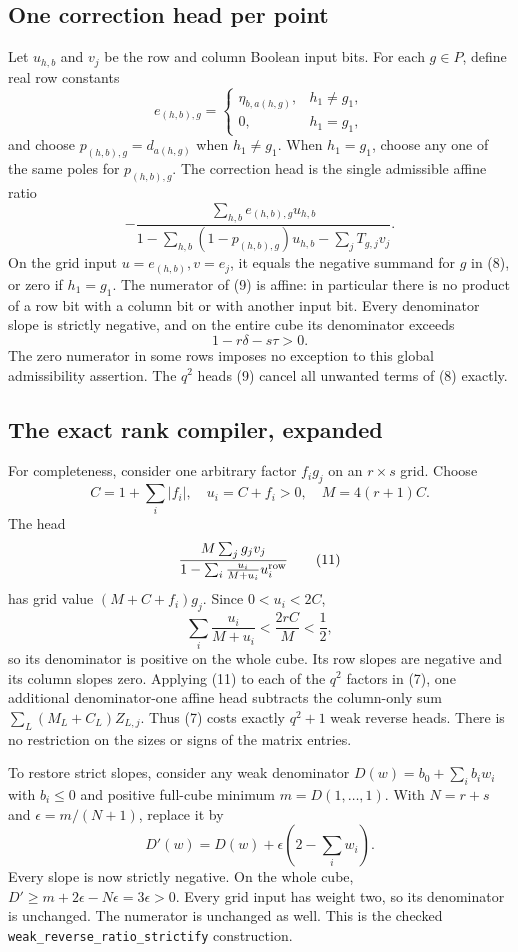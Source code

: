 \documentclass[11pt]{article}
\begin{document}
\subsection{One correction head per point}
Let $u_{h,b}$ and $v_j$ be the row and column Boolean input bits.
For each $g\in P$, define real row constants
\[
 e_{(h,b),g}=
 \begin{cases}\eta_{b,a(h,g)},&h_1\ne g_1,\\0,&h_1=g_1,\end{cases}
\]
and choose $p_{(h,b),g}=d_{a(h,g)}$ when $h_1\ne g_1$.
When $h_1=g_1$, choose any one of the same poles for $p_{(h,b),g}$.
The correction head is the single admissible affine ratio
\[
 -\frac{\sum_{h,b}e_{(h,b),g}u_{h,b}}
 {1-\sum_{h,b}(1-p_{(h,b),g})u_{h,b}-\sum_jT_{g,j}v_j}.
 \tag{9}
\]
On the grid input $u=e_{(h,b)},v=e_j$, it equals the negative
summand for $g$ in (8), or zero if $h_1=g_1$. The numerator of (9)
is affine: in particular there is no product of a row bit with a
column bit or with another input bit. Every denominator slope is
strictly negative, and on the entire cube its denominator exceeds
\[
 1-r\delta-s\tau>0.
 \tag{10}
\]
The zero numerator in some rows imposes no exception to this global
admissibility assertion. The $q^2$ heads (9) cancel all unwanted
terms of (8) exactly.

\subsection{The exact rank compiler, expanded}
For completeness, consider one arbitrary factor $f_i g_j$ on an
$r\times s$ grid. Choose
\[
 C=1+\sum_i|f_i|,\quad u_i=C+f_i>0,
 \quad M=4(r+1)C.
\]
The head
\[
 \frac{M\sum_jg_jv_j}
 {1-\sum_i\frac{u_i}{M+u_i}u^{\rm row}_i}
 \tag{11}
\]
has grid value $(M+C+f_i)g_j$. Since $0<u_i<2C$,
\[
 \sum_i\frac{u_i}{M+u_i}<\frac{2rC}{M}<\frac12,
\]
so its denominator is positive on the whole cube. Its row slopes are
negative and its column slopes zero. Applying (11) to each of the
$q^2$ factors in (7), one additional denominator-one affine head
subtracts the column-only sum $\sum_L(M_L+C_L)Z_{L,j}$.
Thus (7) costs exactly $q^2+1$ weak reverse heads. There is no
restriction on the sizes or signs of the matrix entries.

To restore strict slopes, consider any weak denominator
$D(w)=b_0+\sum_i b_iw_i$ with $b_i\le0$ and positive full-cube
minimum $m=D(1,\ldots,1)$. With $N=r+s$ and
$\epsilon=m/(N+1)$, replace it by
\[
 D'(w)=D(w)+\epsilon\left(2-\sum_iw_i\right).
 \tag{12}
\]
Every slope is now strictly negative. On the whole cube,
$D'\ge m+2\epsilon-N\epsilon=3\epsilon>0$.
Every grid input has weight two, so its denominator is unchanged.
The numerator is unchanged as well. This is the checked
\texttt{weak\_reverse\_ratio\_strictify} construction.
\end{document}
